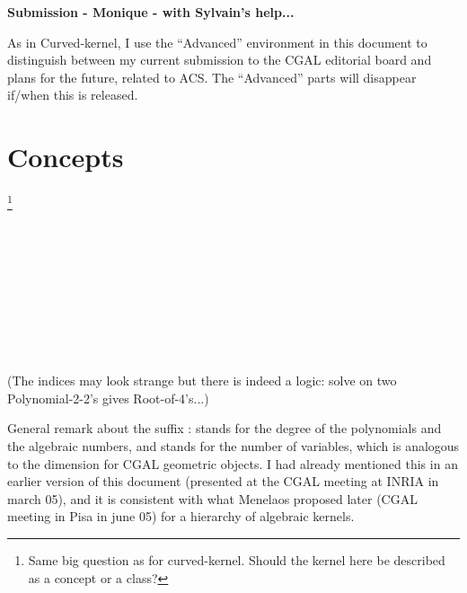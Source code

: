
\textbf{Submission - Monique - with Sylvain's help...}

\begin{ccAdvanced}
As in Curved-kernel, I use the ``Advanced'' environment in this
document to distinguish between my current submission to the CGAL
editorial board and plans for the future, related to ACS. The
``Advanced'' parts will disappear if/when this is released.
\end{ccAdvanced}

\section*{Concepts}

\footnote{Same big question as for curved-kernel. Should the kernel here
be described as a concept or a class?}

\\
\\
\\
\\

\begin{ccAdvanced}
\\
\\
\\
\\

(The indices may look strange but there is indeed a logic: solve on two
Polynomial-2-2's gives Root-of-4's...)

General remark about the suffix :  stands 
for the degree of the polynomials and the algebraic numbers, and
 stands for the number of variables, which is analogous to the
dimension for CGAL geometric objects. I had already mentioned this in an
earlier version of this document (presented at the CGAL meeting at
INRIA in march 05), and it is consistent with what Menelaos proposed
later (CGAL meeting in Pisa in june 05) for a hierarchy of algebraic kernels.
\end{ccAdvanced}

